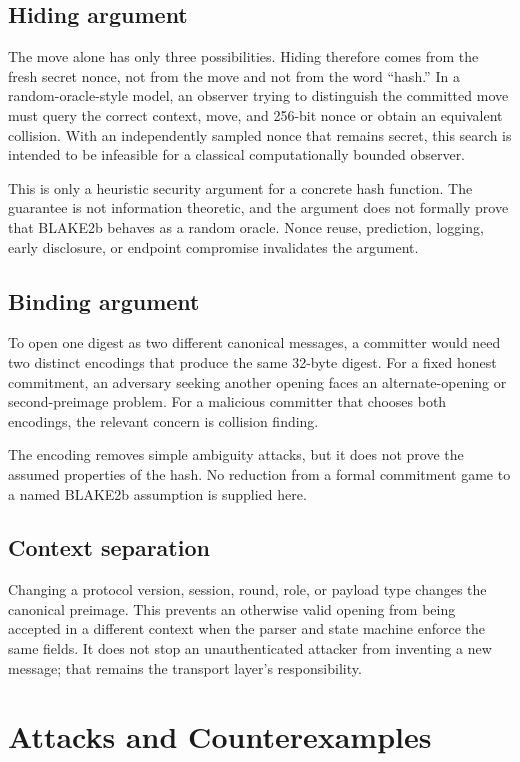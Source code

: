 \subsection{Hiding argument}

The move alone has only three possibilities. Hiding therefore comes from the
fresh secret nonce, not from the move and not from the word ``hash.'' In a
random-oracle-style model, an observer trying to distinguish the committed
move must query the correct context, move, and 256-bit nonce or obtain an
equivalent collision. With an independently sampled nonce that remains secret,
this search is intended to be infeasible for a classical computationally
bounded observer.

This is only a heuristic security argument for a concrete hash function. The
guarantee is not information theoretic, and the argument does not formally
prove that BLAKE2b behaves as a random oracle. Nonce reuse, prediction,
logging, early disclosure, or endpoint compromise invalidates the argument.

\subsection{Binding argument}

To open one digest as two different canonical messages, a committer would need
two distinct encodings that produce the same 32-byte digest. For a fixed
honest commitment, an adversary seeking another opening faces an
alternate-opening or second-preimage problem. For a malicious committer that
chooses both encodings, the relevant concern is collision finding.

The encoding removes simple ambiguity attacks, but it does not prove the
assumed properties of the hash. No reduction from a formal commitment game to
a named BLAKE2b assumption is supplied here.

\subsection{Context separation}

Changing a protocol version, session, round, role, or payload type changes the
canonical preimage. This prevents an otherwise valid opening from being
accepted in a different context when the parser and state machine enforce the
same fields. It does not stop an unauthenticated attacker from inventing a new
message; that remains the transport layer's responsibility.

\section{Attacks and Counterexamples}

